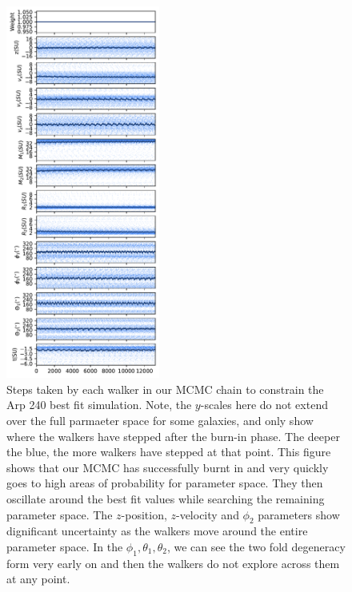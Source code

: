 \begin{figure}
    \centering
    \includegraphics[width=0.45\textwidth]{Chapter1/figures/arp-240-steps.pdf}
    \caption[Steps taken by each walker in our MCMC chain to constrain the Arp 240 best fit simulation.]{Steps taken by each walker in our MCMC chain to constrain the Arp 240 best fit simulation. Note, the $y$-scales here do not extend over the full parmaeter space for some galaxies, and only show where the walkers have stepped after the burn-in phase. The deeper the blue, the more walkers have stepped at that point. This figure shows that our MCMC has successfully burnt in and very quickly goes to high areas of probability for parameter space. They then oscillate around the best fit values while searching the remaining parameter space. The $z$-position, $z$-velocity and $\phi_{2}$ parameters show dignificant uncertainty as the walkers move around the entire parameter space. In the $\phi_{1}, \theta_{1}, \theta_{2}$, we can see the two fold degeneracy form very early on and then the walkers do not explore across them at any point.}
    \label{fig:walker_steps}
\end{figure}

